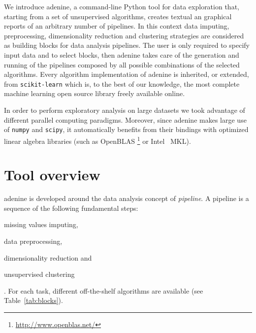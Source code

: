\documentclass[twoside,11pt]{article}
\makeatletter
\newcommand{\ade}{{\sc adenine}\@\xspace}
\newcommand{\py}{{Python}\@\xspace}
\makeatother
\begin{document}
We introduce \ade, a command-line \py tool for data exploration that, starting from a set of unsupervised algorithms, creates textual an graphical reports of an arbitrary number of pipelines. In this context data imputing, preprocessing, dimensionality reduction and clustering strategies are considered as building blocks for data analysis pipelines. The user is only required to specify input data and to select blocks, then \ade takes care of the generation and running of the pipelines composed by all possible combinations of the selected algorithms. Every algorithm implementation of \ade is inherited, or extended, from \texttt{scikit-learn} \citep{scikit-learn} which is, to the best of our knowledge, the most complete machine learning open source library freely available online.

In order to perform exploratory analysis on large datasets we took advantage of different parallel computing paradigms. %
Moreover, since \ade makes large use of \texttt{numpy} and \texttt{scipy}, it automatically benefits from their bindings with optimized linear algebra libraries (such as OpenBLAS \footnote{\url{http://www.openblas.net/}} or Intel \textsuperscript{\textregistered}~MKL).

\section{Tool overview}\label{sec:implem}
\ade is developed around the data analysis concept of \emph{pipeline}. A pipeline is a sequence of the following fundamental steps:
\begin{enumerate*}[label=(\roman*)]
  \item missing values imputing,
  \item data preprocessing,
  \item dimensionality reduction and
  \item unsupervised clustering
\end{enumerate*}. 
For each task, different off-the-shelf algorithms are available (see Table~\ref{tab:blocks}).%

\end{document}
